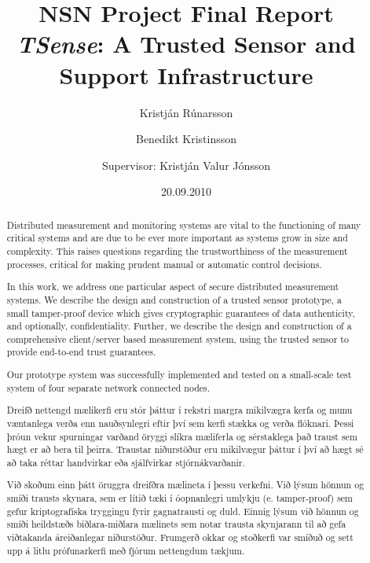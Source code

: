 \documentclass[10pt,titlepage,twoside,a4paper]{report}
\author{Kristj\'{a}n R\'{u}narsson \and Benedikt Kristinsson\\\and Supervisor: Kristj\'{a}n Valur J\'{o}nsson}
\title{NSN Project Final Report\\\textit{TSense}: A Trusted Sensor and Support Infrastructure}
\date{20.09.2010}
\begin{document}
\maketitle
\newpage
\ \ \ \\
\newpage

\setcounter{page}{1}

\tableofcontents
\pagestyle{empty}
\newpage
\ \ \ \\
\newpage
\pagebreak

\begin{abstract}
Distributed measurement and monitoring systems are vital to the functioning of many critical systems and are due to be ever more important as systems grow in size and complexity. This raises questions regarding the trustworthiness of the measurement processes, critical for making prudent manual or automatic control decisions. 

In this work, we address one particular aspect of secure distributed measurement systems. We describe the design and construction of a trusted sensor prototype, a small tamper-proof device which gives cryptographic guarantees of data authenticity, and optionally, confidentiality. Further, we describe the design and construction of a comprehensive client/server based measurement system, using the trusted sensor to provide end-to-end trust guarantees. 


%
Our prototype system was successfully implemented and tested on a small-scale test system of four separate network connected nodes.
\end{abstract}

\renewcommand{\abstractname}{{\'{U}}tdr\'{a}ttur}
\begin{abstract}
Dreifð nettengd mælikerfi eru stór þáttur í rekstri margra mikilvægra kerfa og munu væntanlega verða enn nauðsynlegri eftir því sem kerfi stækka og verða flóknari. Þessi þróun vekur spurningar varðand öryggi slíkra mæliferla og sérstaklega það traust sem hægt er að bera til þeirra. Traustar niðurstöður eru mikilvægur þáttur í því að hægt sé að taka réttar handvirkar eða sjálfvirkar stjórnákvarðanir.

Við skoðum einn þátt öruggra dreifðra mælineta í þessu verkefni. Við lýsum hönnun og smíði trausts skynara, sem er lítið tæki í óopnanlegri umlykju (e. tamper-proof) sem gefur kriptografíska tryggingu fyrir gagnatrausti og duld. Einnig lýsum við hönnun og smíði heildstæðs biðlara-miðlara mælinets sem  notar trausta skynjarann til að gefa viðtakanda áreiðanlegar niðurstöður.
%
Frumgerð okkar og stoðkerfi var smíðuð og sett upp á litlu prófunarkerfi með fjórum nettengdum tækjum.
\end{abstract}

\setcounter{page}{1}
\pagestyle{headings}








\end{document}
